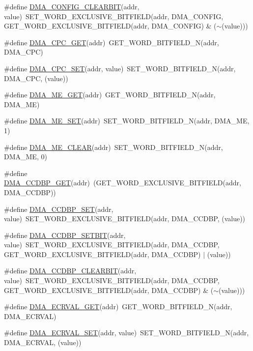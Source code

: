 \begin{DoxyCompactItemize}
\item 
\#define \hyperlink{a00548_ad9714742278aa51bd20bdf26b22ee34f}{DMA\_\-CONFIG\_\-CLEARBIT}(addr, value)~SET\_\-WORD\_\-EXCLUSIVE\_\-BITFIELD(addr, DMA\_\-CONFIG, GET\_\-WORD\_\-EXCLUSIVE\_\-BITFIELD(addr, DMA\_\-CONFIG) \& ($\sim$(value)))
\item 
\#define \hyperlink{a00548_a4ef686d4b0bc296072ffa2d83212fb9c}{DMA\_\-CPC\_\-GET}(addr)~GET\_\-WORD\_\-BITFIELD\_\-N(addr, DMA\_\-CPC)
\item 
\#define \hyperlink{a00548_a9de192e72c2b760971246d0b06c82c4c}{DMA\_\-CPC\_\-SET}(addr, value)~SET\_\-WORD\_\-BITFIELD\_\-N(addr, DMA\_\-CPC, (value))
\item 
\#define \hyperlink{a00548_a4d85df1d844d1958a17d6a4cf36ed5d5}{DMA\_\-ME\_\-GET}(addr)~GET\_\-WORD\_\-BITFIELD\_\-N(addr, DMA\_\-ME)
\item 
\#define \hyperlink{a00548_a99d75fb26d17d099a9108b36e11ee967}{DMA\_\-ME\_\-SET}(addr)~SET\_\-WORD\_\-BITFIELD\_\-N(addr, DMA\_\-ME, 1)
\item 
\#define \hyperlink{a00548_a4fb304164bef9d46b9b4eaa9a9b62ba2}{DMA\_\-ME\_\-CLEAR}(addr)~SET\_\-WORD\_\-BITFIELD\_\-N(addr, DMA\_\-ME, 0)
\item 
\#define \hyperlink{a00548_af08c5f01241dfd9397695ad11800b1d2}{DMA\_\-CCDBP\_\-GET}(addr)~(GET\_\-WORD\_\-EXCLUSIVE\_\-BITFIELD(addr, DMA\_\-CCDBP))
\item 
\#define \hyperlink{a00548_a63e776d59e351bd8c67c44f3082cb463}{DMA\_\-CCDBP\_\-SET}(addr, value)~SET\_\-WORD\_\-EXCLUSIVE\_\-BITFIELD(addr, DMA\_\-CCDBP, (value))
\item 
\#define \hyperlink{a00548_afcdef45bee8e9610a1177e2764aab4ca}{DMA\_\-CCDBP\_\-SETBIT}(addr, value)~SET\_\-WORD\_\-EXCLUSIVE\_\-BITFIELD(addr, DMA\_\-CCDBP, GET\_\-WORD\_\-EXCLUSIVE\_\-BITFIELD(addr, DMA\_\-CCDBP) $|$ (value))
\item 
\#define \hyperlink{a00548_abf1cf0c117fa8d9804f689144d60c9c3}{DMA\_\-CCDBP\_\-CLEARBIT}(addr, value)~SET\_\-WORD\_\-EXCLUSIVE\_\-BITFIELD(addr, DMA\_\-CCDBP, GET\_\-WORD\_\-EXCLUSIVE\_\-BITFIELD(addr, DMA\_\-CCDBP) \& ($\sim$(value)))
\item 
\#define \hyperlink{a00548_ad655c530be11e49d8a5309a267d317a3}{DMA\_\-ECRVAL\_\-GET}(addr)~GET\_\-WORD\_\-BITFIELD\_\-N(addr, DMA\_\-ECRVAL)
\item 
\#define \hyperlink{a00548_a5b8d95da76ea102538d293f2e9e7404e}{DMA\_\-ECRVAL\_\-SET}(addr, value)~SET\_\-WORD\_\-BITFIELD\_\-N(addr, DMA\_\-ECRVAL, (value))
\item 

\end{DoxyCompactItemize}
